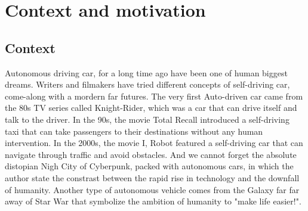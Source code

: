 \documentclass[a4paper]{report}
\begin{document}
\section{Context and motivation}
\label{sec:context}
\subsection{Context}
Autonomous driving car, for a long time ago have been one of human biggest dreams. Writers and filmakers have tried different concepts of self-driving car, come-along with a mordern far futures. The very first Auto-driven car came from the 80s TV series called Knight-Rider, which was a car that can drive itself and talk to the driver. In the 90s, the movie Total Recall introduced a self-driving taxi that can take passengers to their destinations without any human intervention. In the 2000s, the movie I, Robot featured a self-driving car that can navigate through traffic and avoid obstacles. And we cannot forget the absolute distopian Nigh City of Cyberpunk, packed with autonomous cars, in which the author state the constrast between the rapid rise in technology and the downfall of humanity. Another type of autonomous vehicle comes from the Galaxy far far away of Star War that symbolize the ambition of humanity to "make life easier!". 
\end{document}
